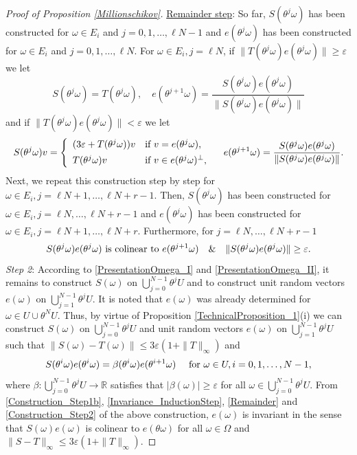 \documentclass[pdflatex,sn-mathphys-num]{sn-jnl}%
\theoremstyle{thmstyleone}%
\theoremstyle{thmstyletwo}%
\theoremstyle{thmstylethree}%
\newcommand{\R}{\mathbb{R}}
\newcommand{\eps}{\varepsilon}
\numberwithin{equation}{section}
\begin{document}
\begin{proof}[Proof of Proposition \ref{Millionschikov}]
\noindent 
\underline{Remainder step}: So far, $S(\theta^j\omega)$ has been constructed for $\omega\in E_i$ and $j=0,1,\dots,\ell N-1$ and $e(\theta^j\omega)$ has been constructed for $\omega\in E_i$ and $j=0,1,\dots,\ell N$. For $\omega\in E_i, j=\ell N$, if $\|T(\theta^{j}\omega) e(\theta^{j}\omega)\|\geq \eps$ we let 
\[
S(\theta^{j}\omega)=T(\theta^{j}\omega),\quad   e(\theta^{j+1}\omega)=\frac{S(\theta^j\omega) e(\theta^j\omega)}{\|S(\theta^j\omega) e(\theta^j\omega)\|}
\]
and if $\|T(\theta^{j}\omega) e(\theta^{j}\omega)\|< \eps$ we let
\[
S(\theta^j\omega) v
=
\left\{
\begin{array}{ll}
  (3\eps+T(\theta^j\omega)) v   & \hbox{if } v=e(\theta^j\omega),\\[1ex]
T(\theta^j\omega) v   &  \hbox{if } v\in e(\theta^j\omega)^{\perp},
\end{array}
\right.\quad e(\theta^{j+1}\omega)=\frac{S(\theta^j\omega) e(\theta^j\omega)}{\|S(\theta^j\omega) e(\theta^j\omega)\|}.
\]
Next, we repeat this construction step by step for  $\omega\in E_i, j=\ell N+1,\dots, \ell N+r-1$. Then, $S(\theta^j\omega)$ has been constructed for $\omega \in E_i, j=\ell N,\dots,\ell N+r-1$ and $e(\theta^j\omega)$ has been constructed for $\omega\in E_i, j=\ell N+1,\dots,\ell N+r$. Furthermore, for $j=\ell N,\dots,\ell N+r-1$
\begin{equation}\label{Remainder}
S(\theta^j\omega)e(\theta^j\omega) \hbox{ is colinear to } e(\theta^{j+1}\omega)
\quad \&\quad \|S(\theta^j\omega)e(\theta^j\omega)\|\geq \eps.
\end{equation}
\emph{Step 2}: According to \eqref{PresentationOmega_I} and \eqref{PresentationOmega_II}, it remains to construct $S(\omega)$ on $\bigcup_{j=0}^{N-1}\theta^j U$ and to construct unit random vectors $e(\omega)$ on $\bigcup_{j=1}^{N-1} \theta^j U$. It is noted that $e(\omega)$ was already determined for $\omega\in U\cup\theta^N U$. Thus, by virtue of Proposition \ref{TechnicalProposition_1}(i) we can construct $S(\omega)$ on $\bigcup_{j=0}^{N-1}\theta^j U$ and unit random vectors $e(\omega)$ on  $\bigcup_{j=1}^{N-1} \theta^j U$ such that $\|S(\omega)-T(\omega)\|\leq 3\eps(1+\|T\|_{\infty})$ and 
\begin{equation}\label{Construction_Step2}
S(\theta^i\omega)e(\theta^i\omega)=\beta(\theta^i\omega)e(\theta^{i+1}\omega)\quad \hbox{ for } \omega\in U, i=0,1,\dots,N-1,
\end{equation}
where $\beta: \bigcup_{j=0}^{N-1}\theta^j U\rightarrow \R$ satisfies that $|\beta(\omega)|\geq \eps$ for all $\omega\in \bigcup_{j=0}^{N-1}\theta^j U$.
From \eqref{Construction_Step1b}, \eqref{Invariance_InductionStep}, \eqref{Remainder} and \eqref{Construction_Step2} of  the above construction,  $e(\omega)$ is invariant in the sense that $S(\omega)e(\omega)$ is colinear to $e(\theta\omega)$ for all $\omega\in\Omega$ and $\|S-T\|_{\infty}\leq 3\eps(1+\|T\|_{\infty})$. 


\end{proof}
\end{document}
